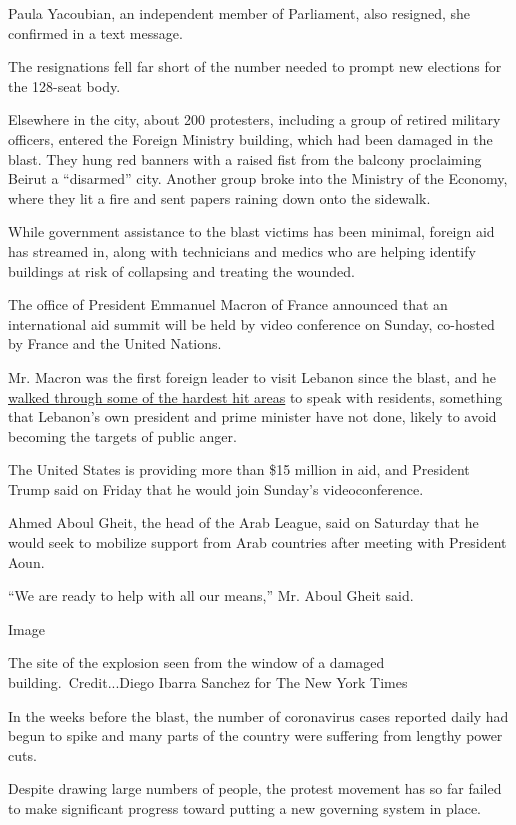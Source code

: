 Paula Yacoubian, an independent member of Parliament, also resigned, she
confirmed in a text message.

The resignations fell far short of the number needed to prompt new
elections for the 128-seat body.

Elsewhere in the city, about 200 protesters, including a group of
retired military officers, entered the Foreign Ministry building, which
had been damaged in the blast. They hung red banners with a raised fist
from the balcony proclaiming Beirut a ``disarmed'' city. Another group
broke into the Ministry of the Economy, where they lit a fire and sent
papers raining down onto the sidewalk.

While government assistance to the blast victims has been minimal,
foreign aid has streamed in, along with technicians and medics who are
helping identify buildings at risk of collapsing and treating the
wounded.

The office of President Emmanuel Macron of France announced that an
international aid summit will be held by video conference on Sunday,
co-hosted by France and the United Nations.

Mr. Macron was the first foreign leader to visit Lebanon since the
blast, and he
\href{https://www.nytimes.com/2020/08/06/world/middleeast/beirut-explosion.html}{walked
through some of the hardest hit areas} to speak with residents,
something that Lebanon's own president and prime minister have not done,
likely to avoid becoming the targets of public anger.

The United States is providing more than \$15 million in aid, and
President Trump said on Friday that he would join Sunday's
videoconference.

Ahmed Aboul Gheit, the head of the Arab League, said on Saturday that he
would seek to mobilize support from Arab countries after meeting with
President Aoun.

``We are ready to help with all our means,'' Mr. Aboul Gheit said.

Image

The site of the explosion seen from the window of a damaged
building.~Credit...Diego Ibarra Sanchez for The New York Times

In the weeks before the blast, the number of coronavirus cases reported
daily had begun to spike and many parts of the country were suffering
from lengthy power cuts.

Despite drawing large numbers of people, the protest movement has so far
failed to make significant progress toward putting a new governing
system in place.

